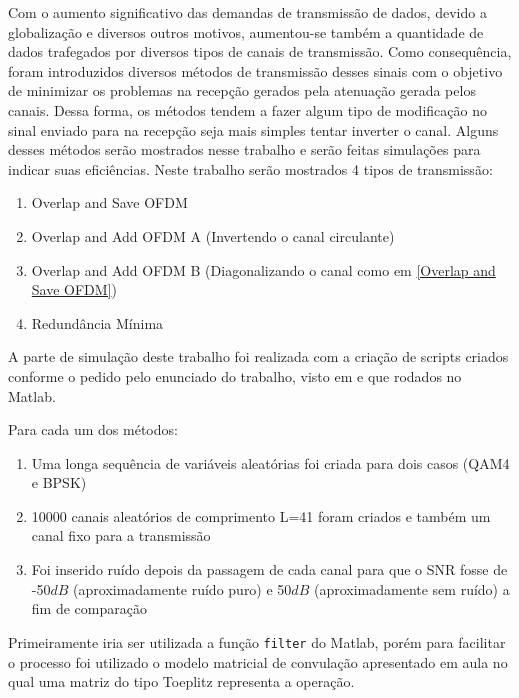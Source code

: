 \documentclass[a4paper,twoside]{articlewithlogo}
\begin{document}
\newcommand{\Matlab}{Matlab\textsuperscript{\textregistered}}

\large
{}

\conteudo
\newpage
{}

Com o aumento significativo das demandas de transmissão de dados, devido a globalização e diversos outros motivos, aumentou-se também a quantidade de dados trafegados por diversos tipos de canais de transmissão. Como consequência, foram introduzidos diversos métodos de transmissão desses sinais com o objetivo de minimizar os problemas na recepção gerados pela atenuação gerada pelos canais. Dessa forma, os métodos tendem a fazer algum tipo de modificação no sinal enviado para na recepção seja mais simples tentar inverter o canal. Alguns desses métodos serão mostrados nesse trabalho e serão feitas simulações para indicar suas eficiências.
Neste trabalho serão mostrados 4 tipos de transmissão: 

\begin{enumerate}

\item Overlap and Save OFDM
\item Overlap and Add OFDM A (Invertendo o canal circulante)
\item Overlap and Add OFDM B (Diagonalizando o canal como em \ref{Overlap and Save OFDM})
\item Redundância Mínima

\end{enumerate}
A parte de simulação deste trabalho foi realizada com a criação de scripts criados conforme o pedido pelo enunciado do trabalho, visto em \cite{Enunciado} e que rodados no \Matlab.

Para cada um dos métodos:

\begin{enumerate}
\item Uma longa sequência de variáveis aleatórias foi criada para dois casos (QAM4 e BPSK)
\item 10000 canais aleatórios de comprimento L=41 foram criados e também um canal fixo para a transmissão
\item Foi inserido ruído depois da passagem de cada canal para que o SNR fosse de -50$dB$ (aproximadamente ruído puro) e 50$dB$ (aproximadamente sem ruído) a fim de comparação
\end{enumerate}

Primeiramente iria ser utilizada a função \verb|filter| do \Matlab, porém para facilitar o processo foi utilizado o modelo matricial de convulação apresentado em aula no qual uma matriz do tipo Toeplitz representa a operação.
 
\end{document}
